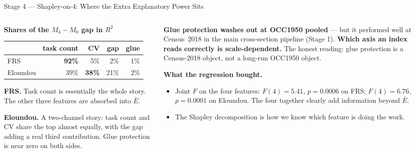 \documentclass[10pt,english,aspectratio=169]{beamer}
\begin{document}
\begin{frame}{Stage 4 --- Shapley-on-4: Where the Extra Explanatory Power Sits}
\begin{columns}[T]
\begin{column}{0.5\textwidth}
\scriptsize
\textbf{Shares of the $M_4 - M_0$ gap in $R^2$}
\begin{tabular}{lrrrr}
\toprule
& \textbf{task count} & \textbf{CV} & \textbf{gap} & \textbf{glue} \\
\midrule
FRS & \textbf{92\%} & 5\% & 2\% & 1\% \\
Eloundou & 39\% & \textbf{38\%} & 21\% & 2\% \\
\bottomrule
\end{tabular}

\vspace{0.25cm}
\textbf{FRS.} Task count is essentially the whole story. The other three features are absorbed into $\bar E$.

\vspace{0.15cm}
\textbf{Eloundou.} A two-channel story: task count and CV share the top almost equally, with the gap adding a real third contribution. Glue protection is near zero on both sides.
\end{column}
\begin{column}{0.48\textwidth}
\begin{tcolorbox}[colback=blue!3,colframe=RedTitle!60]\scriptsize
\textbf{Glue protection washes out at OCC1950 pooled} --- but it performed well at Census~2018 in the main cross-section pipeline (Stage 1). \textbf{Which axis an index reads correctly is scale-dependent.} The honest reading: glue protection is a Census-2018 object, not a long-run OCC1950 object.
\end{tcolorbox}

\vspace{0.15cm}
\textbf{What the regression bought.}
\begin{itemize}\scriptsize
  \item Joint $F$ on the four features: $F(4) = 5.41$, $p = 0.0006$ on FRS; $F(4) = 6.76$, $p = 0.0001$ on Eloundou. The four together clearly add information beyond $\bar E$.
  \item The Shapley decomposition is how we know which feature is doing the work.
\end{itemize}
\end{column}
\end{columns}
\end{frame}
\end{document}
